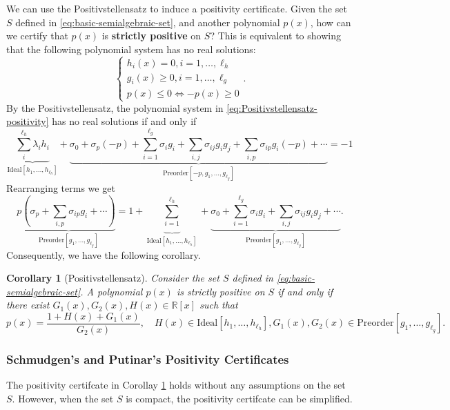 \documentclass[
]{book}
\newtheorem{corollary}{Corollary}[chapter]
\theoremstyle{definition}
\theoremstyle{definition}
\theoremstyle{definition}
\theoremstyle{definition}
\theoremstyle{remark}
\begin{document}
We can use the Positivstellensatz to induce a positivity certificate. Given the set \(S\) defined in \eqref{eq:basic-semialgebraic-set}, and another polynomial \(p(x)\), how can we certify that \(p(x)\) is \textbf{strictly positive} on \(S\)? This is equivalent to showing that the following polynomial system has no real solutions:
\begin{equation}
\begin{cases}
h_i(x) = 0, i=1,\dots,\ell_h \\
g_i(x) \geq 0, i=1,\dots, \ell_g \\
p(x) \leq 0 \Leftrightarrow -p(x) \geq 0
\end{cases}.
\label{eq:Positivstellensatz-positivity}
\end{equation}
By the Positivstellensatz, the polynomial system in \eqref{eq:Positivstellensatz-positivity} has no real solutions if and only if
\[
\underbrace{\sum_{i}^{\ell_h} \lambda_i h_i}_{\mathrm{Ideal}[h_1,\dots,h_{\ell_h}]} + \underbrace{\sigma_0 + \sigma_{p} (-p) + \sum_{i=1}^{\ell_g} \sigma_i g_i + \sum_{i,j} \sigma_{ij} g_i g_j + \sum_{i,p} \sigma_{ip} g_i (-p) + \cdots}_{\mathrm{Preorder}[-p,g_1,\dots,g_{\ell_g}]} = -1
\]
Rearranging terms we get
\[
p\underbrace{\left( \sigma_p + \sum_{i,p} \sigma_{ip} g_i  + \cdots \right)}_{\mathrm{Preorder}[g_1,\dots,g_{\ell_g}]} = 1 + \underbrace{\sum_{i=1}^{\ell_h}}_{\mathrm{Ideal}[h_1,\dots,h_{\ell_h}]} + \underbrace{\sigma_0 + \sum_{i=1}^{\ell_g} \sigma_i g_i + \sum_{i,j} \sigma_{ij} g_i g_j + \cdots}_{\mathrm{Preorder}[g_1,\dots,g_{\ell_g}]}.
\]
Consequently, we have the following corollary.

\begin{corollary}[Positivstellensatz]
\protect\hypertarget{cor:Positivstellensatz}{}\label{cor:Positivstellensatz}Consider the set \(S\) defined in \eqref{eq:basic-semialgebraic-set}. A polynomial \(p(x)\) is strictly positive on \(S\) if and only if there exist \(G_1(x),G_2(x),H(x) \in \mathbb{R}[x]\) such that
\[
p(x) = \frac{1 + H(x) + G_1(x)}{G_2(x)}, \quad H(x) \in \mathrm{Ideal}[h_1,\dots,h_{\ell_h}], G_1(x),G_2(x) \in \mathrm{Preorder}[g_1,\dots,g_{\ell_g}].
\]
\end{corollary}

\subsubsection{Schmudgen's and Putinar's Positivity Certificates}\label{schmudgens-and-putinars-positivity-certificates}

The positivity certifcate in Corollay \ref{cor:Positivstellensatz} holds without any assumptions on the set \(S\). However, when the set \(S\) is compact, the positivity certifcate can be simplified.
\end{document}
